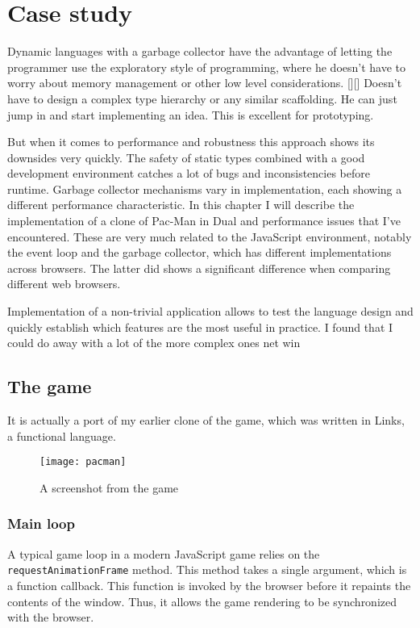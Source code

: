 \chapter{Case study}\label{chap:case}
Dynamic languages with a garbage collector have the advantage of letting the
programmer use the exploratory style of programming, where he doesn't have to
worry about memory management or other low level considerations. [][] Doesn't
have to design a complex type hierarchy or any similar scaffolding. He can just
jump in and start implementing an idea. This is excellent for prototyping.

But when it comes to performance and robustness this approach shows its
downsides very quickly. The safety of static types combined with a good
development environment catches a lot of bugs and inconsistencies before
runtime. Garbage collector mechanisms vary in implementation, each showing a
different performance characteristic. In this chapter I will describe the
implementation of a clone of Pac-Man in Dual and performance issues that I've
encountered. These are very much related to the JavaScript environment, notably
the event loop and the garbage collector, which has different implementations
across browsers. The latter did shows a significant difference when comparing
different web browsers.

Implementation of a non-trivial application allows to test the language design
and quickly establish which features are the most useful in practice.  I found
that I could do away with a lot of the more complex ones %
net win

\section{The game}
It is actually a port of my earlier clone of the game, which was written in
Links\cite{links_site}, a functional language.

\begin{figure}[h!]
    \centering \texttt{[image: pacman]}
    \caption{A screenshot from the game}
    \label{fig:pacman}
\end{figure}

\subsection{Main loop}
A typical game loop in a modern JavaScript
game\cite{mdn_game_anatomy}
relies on the \texttt{requestAnimationFrame}
method\cite{mdn_requestanimationframe}. This
method takes a single argument, which is a function callback. This function is
invoked by the browser before it repaints the contents of the window. Thus, it
allows the game rendering to be synchronized with the browser.

